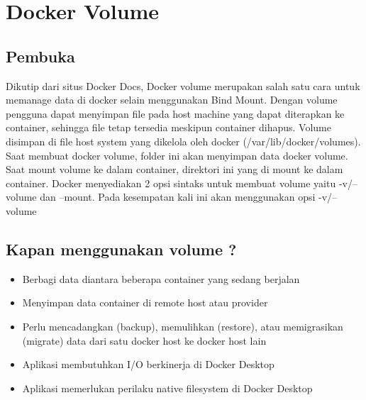 \chapter{Docker Volume}
\section{Pembuka}
Dikutip dari situs Docker Docs, Docker volume merupakan salah satu cara untuk memanage data di docker selain menggunakan Bind Mount. Dengan volume pengguna dapat menyimpan file pada host machine yang dapat diterapkan ke container, sehingga file tetap tersedia meskipun container dihapus. 
Volume disimpan di file host system yang dikelola oleh docker (/var/lib/docker/volumes). Saat membuat docker volume, folder ini akan menyimpan data docker volume. Saat mount volume ke dalam container,
direktori ini yang di mount ke dalam container. Docker menyediakan 2 opsi sintaks untuk membuat volume yaitu -v/--volume dan --mount. Pada kesempatan kali ini akan menggunakan opsi -v/--volume


\section{Kapan menggunakan volume ?}
\begin{itemize}
    \item Berbagi data diantara beberapa container yang sedang berjalan
    \item Menyimpan data container di remote host atau provider
    \item Perlu mencadangkan (backup), memulihkan (restore), atau memigrasikan (migrate) data dari satu docker host ke docker host lain
    \item Aplikasi membutuhkan I/O berkinerja di Docker Desktop
    \item Aplikasi memerlukan perilaku native filesystem di Docker Desktop
\end{itemize}

